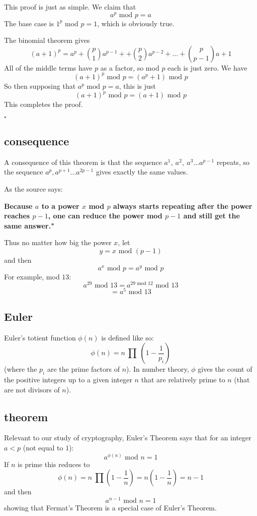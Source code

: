 \documentclass[11pt, oneside]{article}
\begin{document}
This proof is just as simple.  We claim that
\[ a^p  \text{ mod } p = a \]
The base case is $1^p$ mod $p = 1$, which is obviously true.  

The binomial theorem gives
\[  (a+1)^p = a^p + \binom{p}{1} a^{p-1} + + \binom{p}{2} a^{p-2} + \dots + \binom{p}{p-1} a + 1  \]
All of the middle terms have $p$ as a factor, so mod $p$ each is just zero.  We have
\[  (a+1)^p \text{ mod } p = (a^p + 1)  \text{ mod } p \]
So then supposing that $a^p  \text{ mod } p = a$, this is just
\[ (a+1)^p \text{ mod } p= (a + 1) \text{ mod } p \]
This completes the proof.

$\square$

\subsection*{consequence}
A consequence of this theorem is that the sequence $a^1, \ a^2, \ a^3 \dots a^{p-1}$ repeats, so the sequence $a^{p}, a^{p+1} \dots a^{2p - 1}$ gives exactly the same values.

As the source says:

\textbf{Because $a$  to a power $x$ mod $p$ always starts repeating after the power reaches $p-1$, one can reduce the power mod $p-1$ and still get the same answer."}

Thus no matter how big the power $x$, let 
\[ y = x \text{ mod } (p-1) \]
and then
\[ a^x \text{ mod } p = a^{y} \text{ mod } p \]
For example, mod $13$:
\[ a^{29} \text{ mod } 13 = a^{29 \text{ mod } 12} \text{ mod } 13 \]
\[ = a^5  \text{ mod } 13 \]

\subsection*{Euler}
Euler's totient function $\phi(n)$ is defined like so:
\[ \phi(n) = n \ \prod \ (1 - \frac{1}{p_i}) \]
(where the $p_i$ are the prime factors of $n$).  In number theory, $\phi$ gives the count of the positive integers up to a given integer $n$ that are relatively prime to $n$ (that are not divisors of $n$).

\subsection*{theorem}
Relevant to our study of cryptography, Euler's Theorem says that for an integer $a < p$ (not equal to $1$):
\[ a^{\phi(n)} \text{ mod } n = 1 \]
If $n$ is prime this reduces to 
\[ \phi(n) = n \ \prod (1 - \frac{1}{n}) =  n(1 -  \frac{1}{n}) = n - 1 \]
and then
\[ a^{n-1} \text{ mod } n = 1 \]
showing that Fermat's Theorem is a special case of Euler's Theorem.
\end{document}
